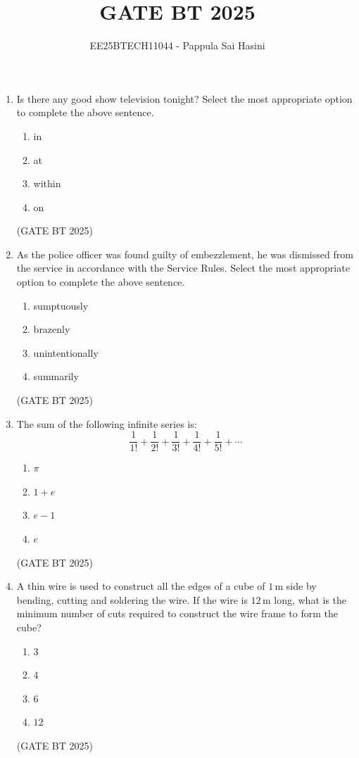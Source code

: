 \documentclass[journal,12pt,onecolumn]{IEEEtran}
\theoremstyle{remark}
\begin{document}
\title{GATE BT 2025}
\author{EE25BTECH11044 - Pappula Sai Hasini}
\maketitle
\renewcommand{\thefigure}{\theenumi}
\renewcommand{\thetable}{\theenumi}

\begin{enumerate}


\item Is there any good show television tonight? Select the most appropriate option to complete the above sentence.
\begin{multicols}{2}
\begin{enumerate}
\item in
\item at
\item within
\item on
\end{enumerate}
\end{multicols}
\hfill (GATE BT 2025)

\item As the police officer was found guilty of embezzlement, he was dismissed from the service in accordance with the Service Rules. Select the most appropriate option to complete the above sentence.
\begin{multicols}{2}
\begin{enumerate}
\item sumptuously
\item brazenly
\item unintentionally
\item summarily
\end{enumerate}
\end{multicols}
\hfill (GATE BT 2025)

\item The sum of the following infinite series is:
\[
\frac{1}{1!} + \frac{1}{2!} + \frac{1}{3!} + \frac{1}{4!} + \frac{1}{5!} + \cdots
\]
\begin{multicols}{2}
\begin{enumerate}
\item $\pi$
\item $1 + e$
\item $e - 1$
\item $e$
\end{enumerate}
\end{multicols}
\hfill (GATE BT 2025)

\item A thin wire is used to construct all the edges of a cube of $1 \, \text{m}$ side by bending, cutting and soldering the wire. If the wire is $12 \, \text{m}$ long, what is the minimum number of cuts required to construct the wire frame to form the cube?
\begin{multicols}{2}
\begin{enumerate}
\item $3$
\item $4$
\item $6$
\item $12$
\end{enumerate}
\end{multicols}
\hfill (GATE BT 2025)


\end{enumerate}
\end{document}

